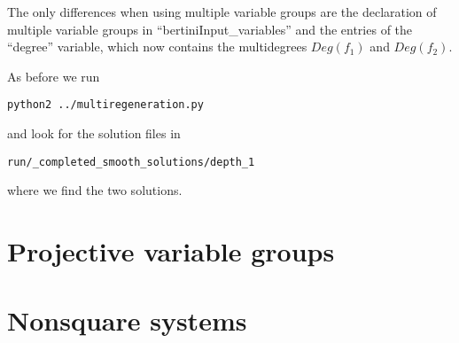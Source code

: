 \documentclass[12pt]{article}
\begin{document}
The only differences when using multiple variable groups are the 
declaration of multiple variable groups in ``bertiniInput\_variables'' 
and the entries of the ``degree'' variable, which now contains the 
multidegrees $Deg(f_1)$ and $Deg(f_2)$.

\noindent As before we run
\begin{leftbar}
\vspace{-10pt} 
\begin{verbatim}
python2 ../multiregeneration.py
\end{verbatim}\vspace{-10pt} 
\end{leftbar}
\noindent and look for the solution files in 
\begin{leftbar}
\vspace{-10pt} 
\begin{verbatim}
run/_completed_smooth_solutions/depth_1
\end{verbatim}\vspace{-10pt} 
\end{leftbar}
\noindent where we find the two solutions.

\section{Projective variable groups}
\section{Nonsquare systems}
\end{document}
